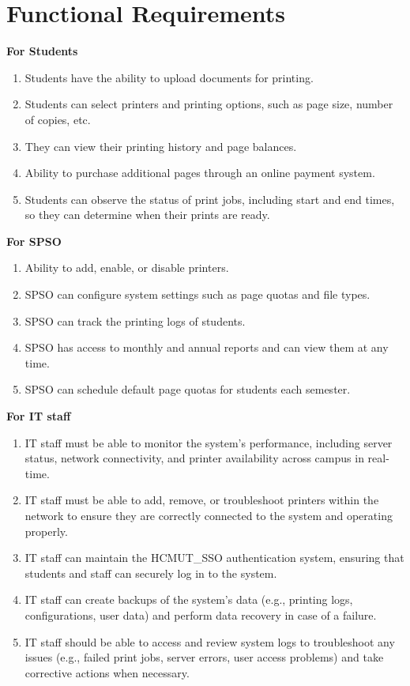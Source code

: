 \documentclass[a4paper]{report}
\begin{document}
\section{Functional Requirements}
\textbf{For Students}
\begin{enumerate}
    \item Students have the ability to upload documents for printing.
    \item Students can select printers and printing options, such as page size, number of copies, etc.
    \item They can view their printing history and page balances.
    \item Ability to purchase additional pages through an online payment system.
    \item Students can observe the status of print jobs, including start and end times, so they can determine when their prints are ready.
\end{enumerate}
\textbf{For SPSO}
\begin{enumerate}
    \item Ability to add, enable, or disable printers.
    \item SPSO can configure system settings such as page quotas and file types.
    \item SPSO can track the printing logs of students.
    \item SPSO has access to monthly and annual reports and can view them at any time.
    \item SPSO can schedule default page quotas for students each semester.
\end{enumerate}
\textbf{For IT staff}
\begin{enumerate}
    \item IT staff must be able to monitor the system’s performance, including server status, network connectivity, and printer availability across campus in real-time.
    \item IT staff must be able to add, remove, or troubleshoot printers within the network to ensure they are correctly connected to the system and operating properly.
    \item IT staff can maintain the HCMUT\_SSO authentication system, ensuring that students and staff can securely log in to the system.
    \item IT staff can create backups of the system's data (e.g., printing logs, configurations, user data) and perform data recovery in case of a failure.
    \item IT staff should be able to access and review system logs to troubleshoot any issues (e.g., failed print jobs, server errors, user access problems) and take corrective actions when necessary.
\end{enumerate}
\end{document}
